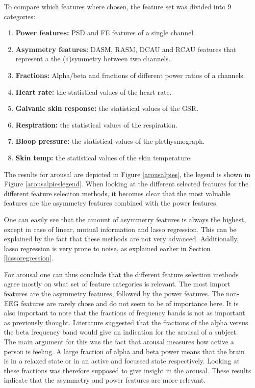 To compare which features where chosen, the feature set was divided into 9 categories:
\begin{enumerate}
\item \textbf{Power features:} PSD and FE features of a single channel
\item \textbf{Asymmetry features:} DASM, RASM, DCAU and RCAU features that represent a the (a)symmetry between two channels.
\item \textbf{Fractions:} Alpha/beta and fractions of different power ratios of a channels.

\item \textbf{Heart rate:} the statistical values of the heart rate.
\item \textbf{Galvanic skin response:} the statistical values of the GSR.
\item \textbf{Respiration:} the statistical values of the respiration.
\item \textbf{Bloop pressure:} the statistical values of the plethysmograph.
\item \textbf{Skin temp:} the statistical values of the skin temperature.
\end{enumerate} 

The results for arousal are depicted in Figure \ref{arousalpies}, the legend is shown in Figure \ref{arousalpieslegend}. When looking at the different selected features for the different feature seleciton methods, it becomes clear that the most valuable features are the asymmetry features combined with the power features.

\npar

One can easily see that the amount of asymmetry features is always the highest, except in case of linear, mutual information and lasso regression. This can be explained by the fact that these methods are not very advanced. Additionally, lasso regression is very prone to noise, as explained earlier in Section \ref{lassoregression}. 

\npar

For arousal one can thus conclude that the different feature selection methods agree mostly on what set of feature categories is relevant. The most import features are the asymmetry features, followed by the power features. The non-EEG features are rarely chose and do not seem to be of importance here. It is also important to note that the fractions of frequency bands is not as important as previously thought. Literature suggested that the fractions of the alpha versus the beta frequency band would give an indication for the arousal of a subject. The main argument for this was the fact that arousal measures how active a person is feeling. A large fraction of alpha and beta power means that the brain is in a relaxed state or in an active and focussed state respectively. Looking at these fractions was therefore supposed to give insight in the arousal. These results indicate that the asymmetry and power features are more relevant.

